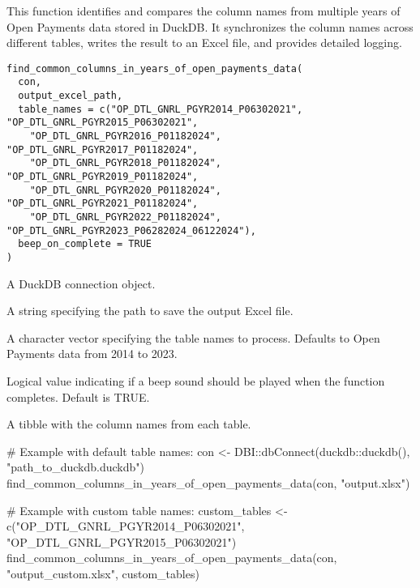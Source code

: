 \documentclass[a4paper]{book}
\begin{document}
%
\begin{Description}
This function identifies and compares the column names from multiple years of
Open Payments data stored in DuckDB. It synchronizes the column names across
different tables, writes the result to an Excel file, and provides detailed logging.
\end{Description}
%
\begin{Usage}
\begin{verbatim}
find_common_columns_in_years_of_open_payments_data(
  con,
  output_excel_path,
  table_names = c("OP_DTL_GNRL_PGYR2014_P06302021", "OP_DTL_GNRL_PGYR2015_P06302021",
    "OP_DTL_GNRL_PGYR2016_P01182024", "OP_DTL_GNRL_PGYR2017_P01182024",
    "OP_DTL_GNRL_PGYR2018_P01182024", "OP_DTL_GNRL_PGYR2019_P01182024",
    "OP_DTL_GNRL_PGYR2020_P01182024", "OP_DTL_GNRL_PGYR2021_P01182024",
    "OP_DTL_GNRL_PGYR2022_P01182024", "OP_DTL_GNRL_PGYR2023_P06282024_06122024"),
  beep_on_complete = TRUE
)
\end{verbatim}
\end{Usage}
%
\begin{Arguments}
\begin{ldescription}
\item[\code{con}] A DuckDB connection object.

\item[\code{output\_excel\_path}] A string specifying the path to save the output Excel file.

\item[\code{table\_names}] A character vector specifying the table names to process.
Defaults to Open Payments data from 2014 to 2023.

\item[\code{beep\_on\_complete}] Logical value indicating if a beep sound should be played when the function completes. Default is TRUE.
\end{ldescription}
\end{Arguments}
%
\begin{Value}
A tibble with the column names from each table.
\end{Value}
%
\begin{Examples}
\begin{ExampleCode}
# Example with default table names:
con <- DBI::dbConnect(duckdb::duckdb(), "path_to_duckdb.duckdb")
find_common_columns_in_years_of_open_payments_data(con, "output.xlsx")

# Example with custom table names:
custom_tables <- c("OP_DTL_GNRL_PGYR2014_P06302021", "OP_DTL_GNRL_PGYR2015_P06302021")
find_common_columns_in_years_of_open_payments_data(con, "output_custom.xlsx", custom_tables)
\end{ExampleCode}
\end{Examples}
\end{document}
